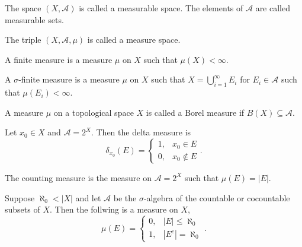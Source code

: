 \documentclass[11pt,a4paper]{article}
\newcommand{\A}{\mathcal A}
\begin{document}
\begin{definition}
  The space $(X,\A)$ is called a measurable space.
  The elements of $\A$ are called measurable sets.
\end{definition}

\begin{definition}
  The triple $(X,\A,\mu)$ is called a measure space.
\end{definition}

\begin{definition}
  A finite measure is a measure $\mu$ on $X$ such that $\mu(X) < \infty$.
\end{definition}

\begin{definition}
  A $\sigma$-finite measure is a measure $\mu$ on $X$ such that
  $X = \bigcup_{i=1}^{\infty} E_i$ for $E_i \in \A$ such that
  $\mu(E_i) < \infty$.
\end{definition}

\begin{definition}
  A measure $\mu$ on a topological space $X$ is called a Borel measure
  if $B(X) \subseteq \A$.
\end{definition}

\begin{example}
  Let $x_0 \in X$ and $\A = 2^X$.
  Then the delta measure is
  \[
    \delta_{x_0}(E) =
    \begin{cases}
      1, &x_0 \in E \\
      0, &x_0 \notin E
    \end{cases}.
  \]
\end{example}

\begin{example}
  The counting measure is the measure on $\A = 2^X$ such that
  $\mu(E) = |E|$.
\end{example}

\begin{example}
  \label{exmp:relevency-measure-on-r}
  Suppose $\aleph_0 < |X|$ and let $\A$ be the $\sigma$-algebra of the countable
  or cocountable subsets of $X$. Then the follwing is a measure on $X$,
  \[
    \mu(E) =
    \begin{cases}
      0, &|E| \le \aleph_0 \\
      1, &|E^c| = \aleph_0
    \end{cases}.
  \]
\end{example}
\end{document}

